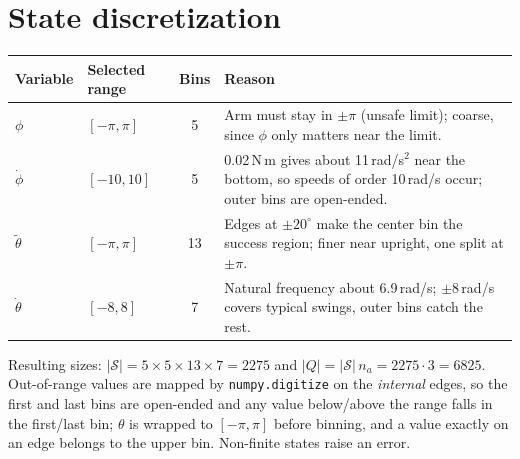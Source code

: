 \documentclass[11pt]{article}
\newcommand{\nstates}{2275}
\newcommand{\nq}{6825}
\newcommand{\nactions}{3}
\newcommand{\shape}{5 \times 5 \times 13 \times 7}
\begin{document}
\section{State discretization}
\begin{center}\begin{tabular}{llcp{6.5cm}}
\toprule
Variable & Selected range & Bins & Reason \\
\midrule
$\phi$ & $[-\pi,\pi]$ & 5 & Arm must stay in $\pm\pi$ (unsafe limit); coarse, since $\phi$ only matters near the limit. \\
$\dot\phi$ & $[-10,10]$ & 5 & 0.02\,N\,m gives about 11\,rad/s$^2$ near the bottom, so speeds of order 10\,rad/s occur; outer bins are open-ended. \\
$\widetilde\theta$ & $[-\pi,\pi]$ & 13 & Edges at $\pm20^\circ$ make the center bin the success region; finer near upright, one split at $\pm\pi$. \\
$\dot\theta$ & $[-8,8]$ & 7 & Natural frequency about 6.9\,rad/s; $\pm8$\,rad/s covers typical swings, outer bins catch the rest. \\
\bottomrule
\end{tabular}\end{center}
Resulting sizes: $|\mathcal S|=\shape=\nstates$ and $|Q|=|\mathcal S|\,n_a=\nstates\cdot\nactions=\nq$.
Out-of-range values are mapped by \texttt{numpy.digitize} on the \emph{internal} edges, so the first and last bins are open-ended and any value below/above the range falls in the first/last bin; $\theta$ is wrapped to $[-\pi,\pi]$ before binning, and a value exactly on an edge belongs to the upper bin. Non-finite states raise an error.
\end{document}
